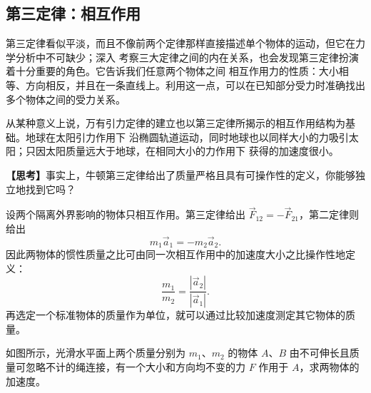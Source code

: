 {\subsection{第三定律：相互作用}

第三定律看似平淡，而且不像前两个定律那样直接描述单个物体的运动，但它在力学分析中不可缺少；深入
考察三大定律之间的内在关系，也会发现第三定律扮演着十分重要的角色。它告诉我们任意两个物体之间
相互作用力的性质：大小相等、方向相反，并且在一条直线上。利用这一点，可以在已知部分受力时准确找出
多个物体之间的受力关系。

从某种意义上说，万有引力定律的建立也以第三定律所揭示的相互作用结构为基础。地球在太阳引力作用下
沿椭圆轨道运动，同时地球也以同样大小的力吸引太阳；只因太阳质量远大于地球，在相同大小的力作用下
获得的加速度很小。

\noindent\textbf{【思考】}事实上，牛顿第三定律给出了质量严格且具有可操作性的定义，你能够独立地找到它吗？

\begin{thinkanswer}
设两个隔离外界影响的物体只相互作用。第三定律给出 $\vec F_{12}=-\vec F_{21}$，第二定律则给出
\[
  m_1\vec a_1=-m_2\vec a_2.
\]
因此两物体的惯性质量之比可由同一次相互作用中的加速度大小之比操作性地定义：
\[
  \boxed{\frac{m_1}{m_2}=\frac{|\vec a_2|}{|\vec a_1|}}.
\]
再选定一个标准物体的质量作为单位，就可以通过比较加速度测定其它物体的质量。
\end{thinkanswer}

\begin{origexamplebox}{}\label{ch06:ex:s04-2-8}
如图所示，光滑水平面上两个质量分别为 $m_1$、$m_2$ 的物体 $A$、$B$ 由不可伸长且质量可忽略不计的绳连接，有一个大小和方向均不变的力 $F$ 作用于 $A$，求两物体的加速度。

\begin{center}\begin{minipage}{\linewidth}\centering
{}
\end{minipage}\end{center}
\label{ch06:fig:s04-2-8}
\end{origexamplebox}

}
